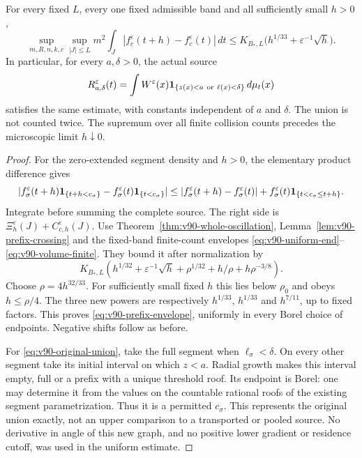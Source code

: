 \begin{theorem}
\label{thm:v90-prefix-envelope}
For every fixed $L$, every one fixed admissible band and all sufficiently
small $h>0$,
\begin{equation}\label{eq:v90-prefix-envelope}
 \sup_{m,R,n,k,c}\sup_{|J|\le L}
 m^2\int_J|f_c^\varepsilon(t+h)-f_c^\varepsilon(t)|\,dt
       \le K_{B_*,L}\bigl(h^{1/33}+\varepsilon^{-1}\sqrt h\bigr).
\end{equation}
In particular, for every $a,\delta>0$, the actual source
\begin{equation}\label{eq:v90-original-union}
 R_{a,\delta}^\varepsilon(t)=\int W^\varepsilon(x)
               \one_{\{z(x)<a\ \mathrm{or}\ \ell(x)<\delta\}}\,d\mu_t(x)
\end{equation}
satisfies the same estimate, with constants independent of $a$ and
$\delta$. The union is not counted twice. The supremum over all finite
collision counts precedes the microscopic limit $h\downarrow0$.
\end{theorem}
\begin{proof}
For the zero-extended segment density and $h>0$, the elementary
product difference gives
\[
 |f_\sigma^\varepsilon(t+h)\mathbf1_{\{t+h<c_\sigma\}}
       -f_\sigma^\varepsilon(t)\mathbf1_{\{t<c_\sigma\}}|
 \le |f_\sigma^\varepsilon(t+h)-f_\sigma^\varepsilon(t)|
       +f_\sigma^\varepsilon(t)\mathbf1_{\{t<c_\sigma\le t+h\}}.
\]
Integrate before summing the complete source. The right side is
$\Xi_h^\varepsilon(J)+C_{c,h}^\varepsilon(J)$. Use
Theorem~\ref{thm:v90-whole-oscillation},
Lemma~\ref{lem:v90-prefix-crossing} and the fixed-band finite-count
envelopes \eqref{eq:v90-uniform-end}--\eqref{eq:v90-volume-finite}.
They bound it after normalization by
\[
 K_{B_*,L}\left(h^{1/32}+\varepsilon^{-1}\sqrt h
                       +\rho^{1/32}+h/\rho+h\rho^{-3/8}\right).
\]
Choose $\rho=4h^{32/33}$. For sufficiently small fixed $h$ this
lies below $\rho_0$ and obeys $h\le\rho/4$. The three new powers
are respectively $h^{1/33}$, $h^{1/33}$ and $h^{7/11}$, up to
fixed factors. This proves \eqref{eq:v90-prefix-envelope}, uniformly
in every Borel choice of endpoints. Negative shifts follow as before.

For \eqref{eq:v90-original-union}, take the full segment when
$\ell_\sigma<\delta$. On every other segment take its initial
interval on which $z<a$. Radial growth makes this interval empty,
full or a prefix with a unique threshold roof. Its endpoint is Borel:
one may determine it from the values on the countable rational roofs
of the existing segment parametrization. Thus it is a permitted
$c_\sigma$. This represents the original union exactly, not an upper
comparison to a transported or pooled source. No derivative in angle
of this new graph, and no positive lower gradient or residence cutoff,
was used in the uniform estimate.
\end{proof}

